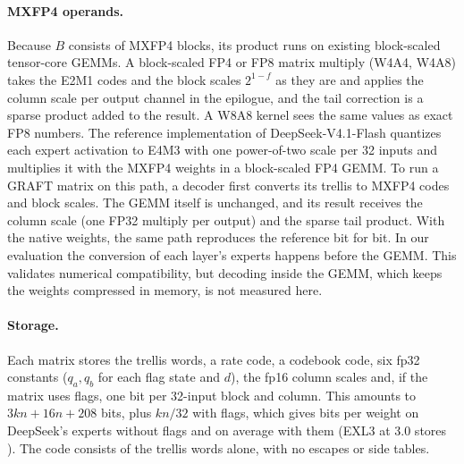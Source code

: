 \paragraph{MXFP4 operands.}
\label{sec:operands}
Because $B$ consists of MXFP4 blocks, its product runs on existing block-scaled tensor-core GEMMs. A block-scaled
FP4 or FP8 matrix multiply (W4A4, W4A8) takes the E2M1 codes and the block scales $2^{1-f}$ as they are and applies the
column scale per output channel in the epilogue, and the tail correction is a sparse product added to the result. A
W8A8 kernel sees the same values as exact FP8 numbers. The reference implementation of DeepSeek-V4.1-Flash quantizes
each expert activation to E4M3 with one power-of-two scale per 32 inputs and multiplies it with the MXFP4 weights in a
block-scaled FP4 GEMM. To run a GRAFT matrix on this path, a decoder first converts its trellis to MXFP4 codes and
block scales. The GEMM itself is unchanged, and its result receives the column scale (one FP32 multiply per output)
and the sparse tail product. With the native weights, the same path reproduces the reference bit for bit. In our
evaluation the conversion of each layer's experts happens before the GEMM. This validates numerical compatibility, but
decoding inside the GEMM, which keeps the weights compressed in memory, is not measured here.

\paragraph{Storage.} Each matrix stores the trellis words, a rate code, a codebook code, six fp32 constants
($q_a,q_b$ for each flag state and $d$), the fp16 column scales and, if the matrix uses flags, one bit per 32-input
block and column. This amounts to $3kn+16n+208$ bits, plus $kn/32$ with flags, which gives  bits per
weight on DeepSeek's experts without flags and  on average with them (EXL3 at 3.0 stores
). The code consists of the trellis words alone, with no escapes or side tables.
